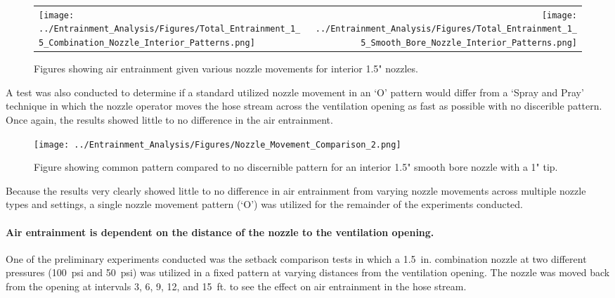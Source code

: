 \documentclass{article}
\begin{document}
\begin{figure}[!ht]
\begin{tabular*}{\textwidth}{lr}
\texttt{[image: ../Entrainment\_Analysis/Figures/Total\_Entrainment\_1\_5\_Combination\_Nozzle\_Interior\_Patterns.png]} &
\texttt{[image: ../Entrainment\_Analysis/Figures/Total\_Entrainment\_1\_5\_Smooth\_Bore\_Nozzle\_Interior\_Patterns.png]} \\
\end{tabular*}
\caption{Figures showing air entrainment given various nozzle movements for interior 1.5" nozzles.}
\label{fig:1_5_Interior_Nozzle_Movement_Comparison}
\end{figure}

A test was also conducted to determine if a standard utilized nozzle movement in an `O' pattern would differ from a `Spray and Pray' technique in which the nozzle operator moves the hose stream across the ventilation opening as fast as possible with no discerible pattern. Once again, the results showed little to no difference in the air entrainment.

\begin{figure}[!ht]
	\centering
	\texttt{[image: ../Entrainment\_Analysis/Figures/Nozzle\_Movement\_Comparison\_2.png]}
	\caption{Figure showing common pattern compared to no discernible pattern for an interior 1.5" smooth bore nozzle with a 1" tip.}
	\label{fig:1_5_Interior_Nozzle_Movement_PatterntoNoPattern_Comparison}
\end{figure}

Because the results very clearly showed little to no difference in air entrainment from varying nozzle movements across multiple nozzle types and settings, a single nozzle movement pattern (`O') was utilized for the remainder of the experiments conducted.

\clearpage

\paragraph{Air entrainment is dependent on the distance of the nozzle to the ventilation opening.} \mbox{}

One of the preliminary experiments conducted was the setback comparison tests in which a 1.5~in. combination nozzle at two different pressures (100~psi and 50~psi) was utilized in a fixed pattern at varying distances from the ventilation opening. The nozzle was moved back from the opening at intervals 3, 6, 9, 12, and 15~ft. to see the effect on air entrainment in the hose stream.
\end{document}
